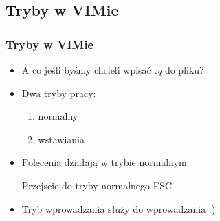 \documentclass{beamer}
\begin{document}
\subsection{Tryby w VIMie}
\begin{frame}
	\frametitle{Tryby w VIMie}
	\begin{itemize}[<+->]
		\item A co jeśli byśmy chcieli wpisać \textit{:q} do pliku?
		\item Dwa tryby pracy:
			\begin{enumerate}
			\item normalny
			\item wstawiania
			\end{enumerate}
		\item Polecenia działają w trybie normalnym
		\begin{block}{Przejscie do tryby normalnego}
			ESC
		\end{block}
		\item Tryb wprowadzania służy do wprowadzania :)
	\end{itemize}
\end{frame}
\end{document}
